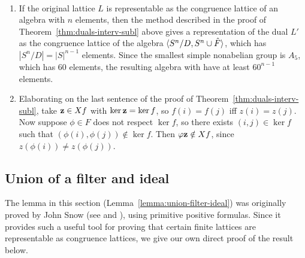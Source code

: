 \begin{remarks}\
  \begin{enumerate}
  \item
    If the original lattice $L$ is representable as the congruence lattice of
    an algebra with $n$ elements, then the method described in the proof of
    Theorem~\ref{thm:duals-interv-subl} above gives a representation of the dual
    $L'$ as the congruence lattice of the algebra
    $\langle S^n/D, S^n \cup \hat{F}\rangle$, which has $|S^n/D| = |S|^{n-1}$ elements.
    Since the smallest simple nonabelian group is $A_5$, which has 60 elements,
    the resulting algebra with have at least $60^{n-1}$ elements.
  \item 
    Elaborating on the last sentence of the proof of Theorem~\ref{thm:duals-interv-subl}, 
    take $\mathbf{z}\in Xf$ with $\ker \mathbf{z} = \ker f$, so $f(i)=f(j)$ iff
    $z(i) = z(j)$.
    Now suppose $\phi\in F$ does not respect $\ker f$, so there exists
    $(i,j) \in \ker f$ such that $(\phi(i), \phi(j)) \notin \ker f$.
    Then $\varphi \mathbf{z} \notin Xf$, since $z(\phi(i)) \neq z(\phi(j))$.
  \end{enumerate}
\end{remarks}

\subsection{Union of a filter and ideal}
\label{sec:union-filter-ideal}
The lemma in this section (Lemma~\ref{lemma:union-filter-ideal})
was originally proved by John Snow (see \cite{MR1774743} and \cite{MR2026829}),
using primitive positive
formulas.  Since it provides such a useful tool for proving that certain finite lattices 
are representable as congruence lattices, we give our own direct
proof of the result below. 


